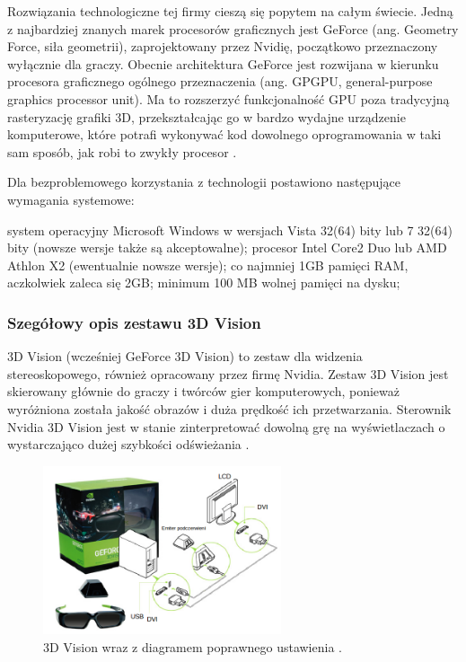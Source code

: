 Rozwiązania technologiczne tej firmy cieszą się popytem na całym świecie. Jedną z najbardziej znanych marek procesorów graficznych jest GeForce (ang. Geometry Force, siła geometrii), zaprojektowany przez Nvidię, początkowo przeznaczony wyłącznie dla graczy. Obecnie architektura GeForce jest rozwijana w kierunku procesora graficznego ogólnego przeznaczenia (ang. GPGPU, general-purpose graphics processor unit). Ma to rozszerzyć funkcjonalność GPU poza tradycyjną rasteryzację grafiki 3D, przekształcając go w bardzo wydajne urządzenie komputerowe, które potrafi wykonywać kod dowolnego oprogramowania w taki sam sposób, jak robi to zwykły procesor \cite{GeForce}. 

Dla bezproblemowego korzystania z technologii postawiono następujące wymagania systemowe: 

\begin{itemize}
\itemi system operacyjny Microsoft Windows w wersjach Vista 32(64) bity lub 7 32(64) bity (nowsze wersje także są akceptowalne);
\itemi procesor  Intel Core2 Duo lub AMD Athlon X2 (ewentualnie nowsze wersje);
\itemi co najmniej 1GB pamięci RAM, aczkolwiek zaleca się 2GB;
\itemi minimum 100 MB wolnej pamięci na dysku;
\end{itemize}

\subsubsection{Szegółowy opis zestawu 3D Vision}
3D Vision (wcześniej GeForce 3D Vision) to zestaw dla widzenia stereoskopowego, również opracowany przez firmę Nvidia. Zestaw 3D Vision jest skierowany głównie do graczy i twórców gier komputerowych, ponieważ wyróżniona została jakość obrazów i duża prędkość ich przetwarzania. Sterownik Nvidia 3D Vision jest w stanie zinterpretować dowolną grę na wyświetlaczach o wystarczająco dużej szybkości odświeżania \cite{NvidiaInfo}. 

\begin{figure}[H]
		\centering
 		\includegraphics[width=7cm]{3dVision.png}
    	\caption{3D Vision wraz z diagramem poprawnego ustawienia \cite{3dVisionPic}.}
 		\label{rys29}
\end{figure}

